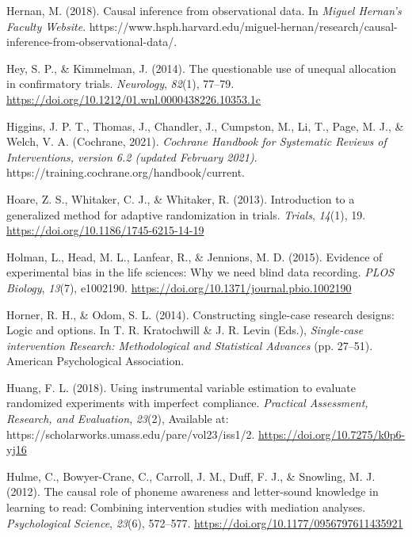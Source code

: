 \documentclass{krantz}
\newlength{\cslhangindent}
\newlength{\cslentryspacingunit} %
\newenvironment{CSLReferences}[2] %
{%
\setlength{\parindent}{0pt}
\ifodd #1
\let\oldpar\par
\def\par{\hangindent=\cslhangindent\oldpar}
\fi
\setlength{\parskip}{#2\cslentryspacingunit}
}%
{}
\begin{document}
\begin{CSLReferences}{1}{0}
\leavevmode{}%
Hernan, M. (2018). Causal inference from observational data. In \emph{Miguel Hernan's Faculty Website}. https://www.hsph.harvard.edu/miguel-hernan/research/causal-inference-from-observational-data/.

\leavevmode{}%
Hey, S. P., \& Kimmelman, J. (2014). The questionable use of unequal allocation in confirmatory trials. \emph{Neurology}, \emph{82}(1), 77--79. \url{https://doi.org/10.1212/01.wnl.0000438226.10353.1c}

\leavevmode{}%
Higgins, J. P. T., Thomas, J., Chandler, J., Cumpston, M., Li, T., Page, M. J., \& Welch, V. A. (Cochrane, 2021). \emph{Cochrane {Handbook} for {Systematic Reviews} of {Interventions}, version 6.2 (updated {February} 2021)}. https://training.cochrane.org/handbook/current.

\leavevmode{}%
Hoare, Z. S., Whitaker, C. J., \& Whitaker, R. (2013). Introduction to a generalized method for adaptive randomization in trials. \emph{Trials}, \emph{14}(1), 19. \url{https://doi.org/10.1186/1745-6215-14-19}

\leavevmode{}%
Holman, L., Head, M. L., Lanfear, R., \& Jennions, M. D. (2015). Evidence of experimental bias in the life sciences: {Why} we need blind data recording. \emph{PLOS Biology}, \emph{13}(7), e1002190. \url{https://doi.org/10.1371/journal.pbio.1002190}

\leavevmode{}%
Horner, R. H., \& Odom, S. L. (2014). Constructing single-case research designs: {Logic} and options. In T. R. Kratochwill \& J. R. Levin (Eds.), \emph{Single-case intervention {Research}: {Methodological} and {Statistical} {Advances}} (pp. 27--51). {American Psychological Association}.

\leavevmode{}%
Huang, F. L. (2018). Using instrumental variable estimation to evaluate randomized experiments with imperfect compliance. \emph{Practical Assessment, Research, and Evaluation}, \emph{23}(2), Available at: https://scholarworks.umass.edu/pare/vol23/iss1/2. \url{https://doi.org/10.7275/k0p6-yj16}

\leavevmode{}%
Hulme, C., Bowyer-Crane, C., Carroll, J. M., Duff, F. J., \& Snowling, M. J. (2012). The causal role of phoneme awareness and letter-sound knowledge in learning to read: Combining intervention studies with mediation analyses. \emph{Psychological Science}, \emph{23}(6), 572--577. \url{https://doi.org/10.1177/0956797611435921}


\end{CSLReferences}
\end{document}
